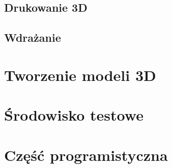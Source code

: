 \documentclass[declaration,shortabstract, inz]{iithesis}
\begin{document}
  
\subsection{Drukowanie 3D}



\subsection{Wdrażanie}
\section{Tworzenie modeli 3D}
\label{section:3d}
\section{Środowisko testowe} %
\section{Część programistyczna}


\end{document}
